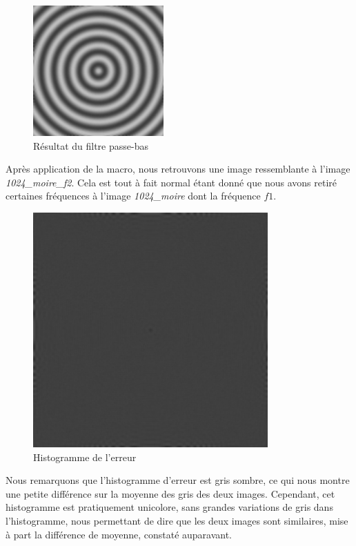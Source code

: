 \documentclass[a4paper,11pt]{article}
\begin{document}
  \begin{figure}[H]
  \centering
   \includegraphics[width=5cm]{../1024_moire_hf.png}
   \caption{Résultat du filtre passe-bas}
  \end{figure}
  
  Après application de la macro, nous retrouvons une image ressemblante à l'image 
  \textit{1024\_moire\_f2}. Cela est tout à fait normal étant donné que nous avons 
  retiré certaines fréquences à l'image \textit{1024\_moire} dont la fréquence $f1$.\\
  
  \begin{figure}[H]
    \centering
    \includegraphics[width=9cm]{../1024_moire_sub.png}
    \caption{Histogramme de l'erreur}
  \end{figure}
  
  Nous remarquons que l'histogramme d'erreur est gris sombre, ce qui nous montre une 
  petite différence sur la moyenne des gris des deux images. Cependant, cet histogramme 
  est pratiquement unicolore, sans grandes variations de gris dans l'histogramme, nous 
  permettant de dire que les deux images sont similaires, mise à part la différence de 
  moyenne, constaté auparavant.\\
  
\end{document}
